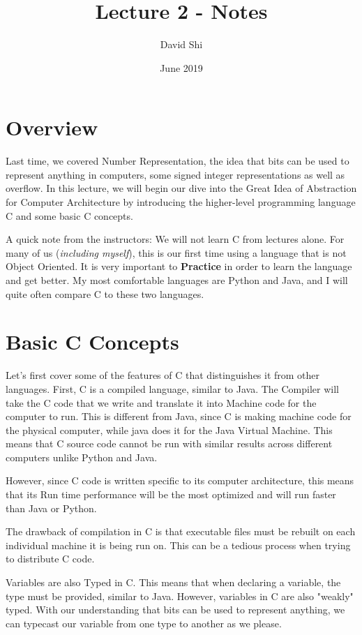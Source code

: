 \documentclass[letterpaper]{article}
\title{Lecture 2 - Notes}
\author{David Shi}
\date{June 2019}
\theoremstyle{remark}
\begin{document}
\maketitle

\section{Overview}
Last time, we covered Number Representation, the idea that bits can be used to represent anything in computers, some signed integer representations as well as overflow. In this lecture, we will begin our dive into the Great Idea of Abstraction for Computer Architecture by introducing the higher-level programming language C and some basic C concepts.

A quick note from the instructors: We will not learn C from lectures alone. For many of us (\textit{including myself}), this is our first time using a language that is not Object Oriented. It is very important to \textbf{Practice} in order to learn the language and get better. My most comfortable languages are Python and Java, and I will quite often compare C to these two languages.

\section{Basic C Concepts}
Let's first cover some of the features of C that distinguishes it from other languages. First, C is a compiled language, similar to Java. The Compiler will take the C code that we write and translate it into Machine code for the computer to run. This is different from Java, since C is making machine code for the physical computer, while java does it for the Java Virtual Machine. This means that C source code cannot be run with similar results across different computers unlike Python and Java.

However, since C code is written specific to its computer architecture, this means that its Run time performance will be the most optimized and will run faster than Java or Python.

The drawback of compilation in C is that executable files must be rebuilt on each individual machine it is being run on. This can be a tedious process when trying to distribute C code.

Variables are also Typed in C. This means that when declaring a variable, the type must be provided, similar to Java. However, variables in C are also "weakly" typed. With our understanding that bits can be used to represent anything, we can typecast our variable from one type to another as we please.
\end{document}
